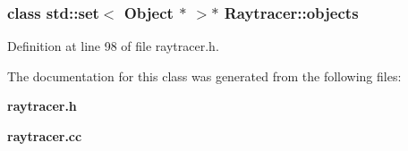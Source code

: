 \subsubsection[{objects}]{\setlength{\rightskip}{0pt plus 5cm}class std\+::set$<$ {\bf Object} $\ast$ $>$$\ast$ Raytracer\+::objects\hspace{0.3cm}{\ttfamily [private]}}\label{class_raytracer_ad2035caf15bcdf69dad408afcb03ea52}


Definition at line 98 of file raytracer.\+h.



The documentation for this class was generated from the following files\+:\begin{DoxyCompactItemize}
\item 
{\bf raytracer.\+h}\item 
{\bf raytracer.\+cc}\end{DoxyCompactItemize}
